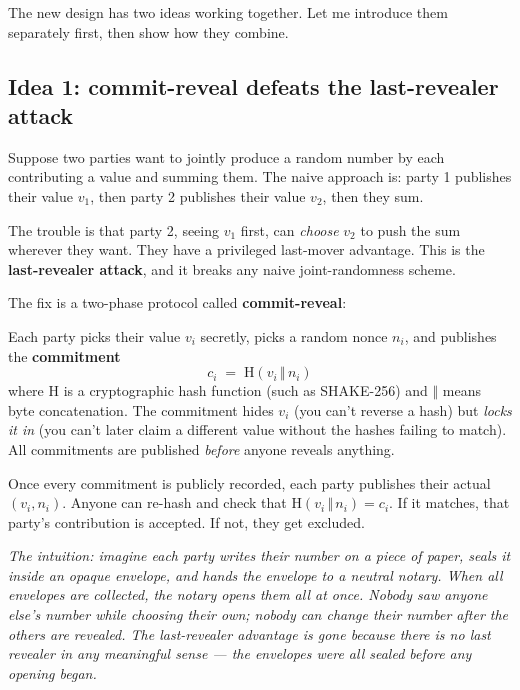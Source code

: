 \documentclass[11pt]{article}
\newenvironment{aside}{\par\medskip\noindent\itshape\small\color{black!70}}{\normalfont\par\medskip}
\newcommand{\formula}[1]{\[\boxed{#1}\]}
\newcommand{\Hash}{\mathrm{H}}
\begin{document}
The new design has two ideas working together. Let me introduce them separately first, then show how they combine.

\subsection*{Idea 1: commit-reveal defeats the last-revealer attack}

Suppose two parties want to jointly produce a random number by each contributing a value and summing them. The naive approach is: party 1 publishes their value $v_1$, then party 2 publishes their value $v_2$, then they sum.

The trouble is that party 2, seeing $v_1$ first, can \emph{choose} $v_2$ to push the sum wherever they want. They have a privileged last-mover advantage. This is the \textbf{last-revealer attack}, and it breaks any naive joint-randomness scheme.

The fix is a two-phase protocol called \textbf{commit-reveal}:

\begin{description}[leftmargin=0pt, itemsep=4pt]
\item[Commit phase.] Each party picks their value $v_i$ secretly, picks a random nonce $n_i$, and publishes the \textbf{commitment}
\formula{c_i \;=\; \Hash(v_i \,\Vert\, n_i)}
where $\Hash$ is a cryptographic hash function (such as SHAKE-256) and $\Vert$ means byte concatenation. The commitment hides $v_i$ (you can't reverse a hash) but \emph{locks it in} (you can't later claim a different value without the hashes failing to match). All commitments are published \emph{before} anyone reveals anything.
\item[Reveal phase.] Once every commitment is publicly recorded, each party publishes their actual $(v_i, n_i)$. Anyone can re-hash and check that $\Hash(v_i \,\Vert\, n_i) = c_i$. If it matches, that party's contribution is accepted. If not, they get excluded.
\end{description}

\begin{aside}
The intuition: imagine each party writes their number on a piece of paper, seals it inside an opaque envelope, and hands the envelope to a neutral notary. When all envelopes are collected, the notary opens them all at once. Nobody saw anyone else's number while choosing their own; nobody can change their number after the others are revealed. The last-revealer advantage is gone because there \emph{is} no last revealer in any meaningful sense --- the envelopes were all sealed before any opening began.
\end{aside}
\end{document}
